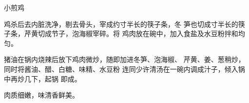 \begin{recipe}{小煎鸡}

\ingredients


\cooking

鸡杀后去内脏洗净，剔去骨头，宰成约寸半长的筷子条，冬
笋也切成寸半长的筷子条，芹黄切成节子，泡海椒宰碎。将
鸡肉放在碗中，加入食盐及水豆粉拌和均匀。

猪油在锅内烧辣后放下鸡肉微炒，随即加进冬笋、泡海椒、
芹黄、姜、葱稍炒，同时将酱油、醋、白糖、味精、水豆粉
连同少许清汤在一碗内调成汁子，倾入锅中再炒几下，起锅
即成。

\notes

肉质细嫩，味清香鲜美。

\end{recipe}

